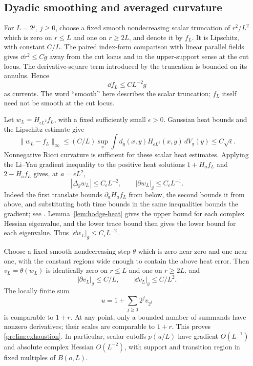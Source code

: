 \subsection{Dyadic smoothing and averaged curvature}

For $L=2^j$, $j\ge0$, choose a fixed smooth nondecreasing scalar
truncation of $r^2/L^2$ which is zero on $r\le L$ and one on
$r\ge2L$, and denote it by $f_L$.  It is Lipschitz, with constant
$C/L$.  The paired index-form comparison with linear parallel fields
gives $\dd r^2\le Cg$ away from the cut locus and in the upper-support
sense at the cut locus.  The derivative-square term introduced by the
truncation is bounded on its annulus.  Hence
\[
 \dd f_L\le CL^{-2}g
\]
as currents.  The word ``smooth'' here describes the scalar
truncation; $f_L$ itself need not be smooth at the cut locus.

Let $w_L=H_{\epsilon L^2}f_L$, with a fixed sufficiently small
$\epsilon>0$.  Gaussian heat bounds and the Lipschitz estimate give
\[
 \|w_L-f_L\|_\infty
 \le (C/L)\sup_x\int d_g(x,y)H_{\epsilon L^2}(x,y)\,dV_g(y)
 \le C\sqrt\epsilon.
\]
Nonnegative Ricci curvature is sufficient for these scalar heat
estimates.  Applying the Li--Yau gradient inequality to the positive
heat solutions $1+H_af_L$ and $2-H_af_L$ gives, at
$a=\epsilon L^2$,
\[
 |\Delta_g w_L|\le C_\epsilon L^{-2},\qquad
 |\partial w_L|_g\le C_\epsilon L^{-1}.
\]
Indeed the first translate bounds $\partial_aH_af_L$ from below,
the second bounds it from above, and substituting both time bounds
in the same inequalities bounds the gradient; see
\cite[Theorem~1.3(i)]{LiYau}.
Lemma~\ref{lem:hodge-heat} gives the upper bound for each complex
Hessian eigenvalue, and the lower trace bound then gives the lower
bound for each eigenvalue.  Thus $|\dd w_L|_g\le C_\epsilon L^{-2}$.

Choose a fixed smooth nondecreasing step $\theta$ which is zero near
zero and one near one, with the constant regions wide enough to
contain the above heat error.  Then $v_L=\theta(w_L)$ is identically
zero on $r\le L$ and one on $r\ge2L$, and
\[
 |\partial v_L|_g\le C/L,\qquad |\dd v_L|_g\le C/L^2.
\]
The locally finite sum
\[
 u=1+\sum_{j\ge0}2^jv_{2^j}
\]
is comparable to $1+r$.  At any point, only a bounded number of
summands have nonzero derivatives; their scales are comparable to
$1+r$.  This proves \eqref{prelim:exhaustion}.  In particular, scalar
cutoffs $p(u/L)$ have gradient $O(L^{-1})$ and absolute complex
Hessian $O(L^{-2})$, with support and transition region in fixed
multiples of $B(o,L)$.


